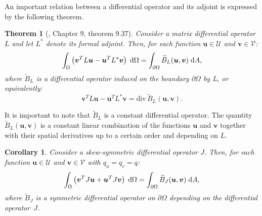 \documentclass[11pt]{article}
\newtheorem{theorem}{Theorem}
\newtheorem{corollary}{Corollary}
\begin{document}
{		An important relation between a differential operator and
		its adjoint is expressed by the following theorem.
		\begin{theorem}[\cite{PDE}, Chapter 9, theorem 9.37]
			Consider a matrix differential operator $L$ and let $L^*$ denote its formal adjoint. Then, for each function $\bm{u} \in \mathcal{U}$ and $\bm{v} \in \mathcal{V}$:
			\begin{equation}
			\int_{\Omega} \left( \bm{v}^T L \bm{u} - \bm{u}^T L^* \bm{v}\right) \d\Omega= \int_{\partial \Omega} \widetilde{B}_L(\bm{u}, \bm{v}) \d{A},
			\end{equation}
			where $\widetilde{B}_L$ is a differential operator induced on the boundary $\partial\Omega$ by L, or equivalently:
			\begin{equation}
			\bm{v}^T L \bm{u} - \bm{u}^T L^* \bm{v} = \mathrm{div} \, \widetilde{B}_L(\bm{u}, \bm{v}).
			\end{equation}
		\end{theorem}
		It is important to note that $\widetilde{B}_L$ is a constant differential operator. The quantity $\widetilde{B}_L(\bm{u}, \bm{v})$ is a constant linear combination of the functions $\bm{u}$ and $\bm{v}$ together with their spatial derivatives up to a certain order and depending on $L$.
		\begin{corollary}
			Consider a skew-symmetric differential operator $J$. Then, for each function $\bm{u} \in \mathcal{U}$ and $\bm{v} \in \mathcal{V}$ with $q_u = q_v = q$:
			\begin{equation}
			\int_{\Omega} \left( \bm{v}^T J \bm{u} + \bm{u}^T J \bm{v}\right) \d\Omega= \int_{\partial \Omega} \widetilde{B}_J(\bm{u}, \bm{v}) \d{A},
			\end{equation}
			where $\widetilde{B}_J$ is a symmetric differential operator on $\partial\Omega$ depending on the differential operator~$J$.
		\end{corollary}
}
\end{document}
